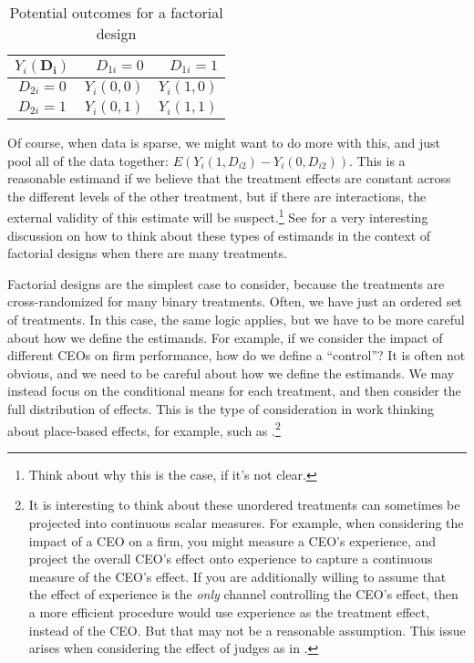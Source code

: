 \documentclass{tufte-handout}
\theoremstyle{break}
\begin{document}
\begin{table}[ht]
    \label{tab:factorial}
  \begin{center}
\begin{tabular}{c|rr}
  $ Y_{i}(\mathbf{D_{i}})$ & $D_{1i} = 0$ & $D_{1i} = 1$\\
  \midrule
  $D_{2i} = 0$ & $Y_{i}(0,0)$ & $Y_{i}(1,0)$\\
  $D_{2i} = 1$ & $Y_{i}(0,1)$ & $Y_{i}(1,1)$\\
\end{tabular}
\end{center}
\caption{Potential outcomes for a factorial design}
\end{table}

Of course, when data is sparse, we might want to do more with this, and just pool all of the data together: $E(Y_{i}(1, D_{i2}) - Y_{i}(0, D_{i2}))$. This is a reasonable estimand if we believe that the treatment effects are constant across the different levels of the other treatment, but if there are interactions, the external validity of this estimate will be suspect.\footnote{Think about why this is the case, if it's not clear.} See \citet{banerjee2021selecting} for a very interesting discussion on how to think about these types of estimands in the context of factorial designs when there are many treatments.

Factorial designs are the simplest case to consider, because the treatments are cross-randomized for many binary treatments. Often, we have just an ordered set of treatments. In this case, the same logic applies, but we have to be more careful about how we define the estimands. For example, if we consider the impact of different CEOs on firm performance, how do we define a ``control''? It is often not obvious, and we need to be careful about how we define the estimands. We may instead focus on the conditional means for each treatment, and then consider the full distribution of effects. This is the type of consideration in work thinking about place-based effects, for example, such as \citet{chetty2018impacts}.\footnote{It is interesting to think about these unordered treatments can sometimes be projected into continuous scalar measures. For example, when considering the impact of a CEO on a firm, you might measure a CEO's experience, and project the overall CEO's effect onto experience to capture a continuous measure of the CEO's effect. If you are additionally willing to assume that the effect of experience is the \emph{only} channel controlling the CEO's effect, then a more efficient procedure would use experience as the treatment effect, instead of the CEO. But that may not be a reasonable assumption. This issue arises when considering the effect of judges as in \citet{arnold2022measuring}.}
\end{document}
